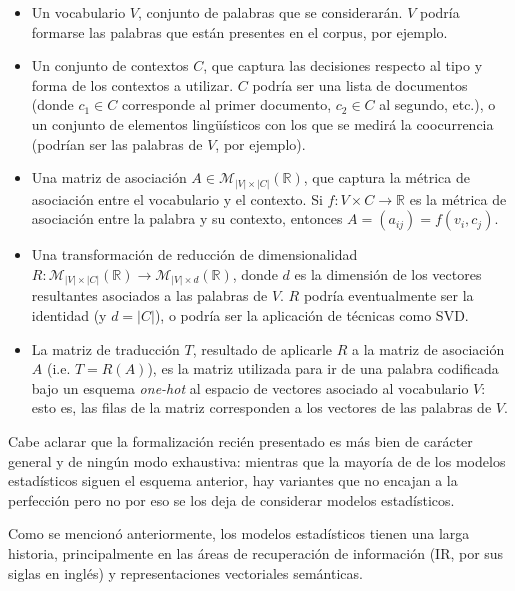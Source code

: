 \begin{itemize}

\item Un vocabulario $V$, conjunto de palabras que se considerarán. $V$ podría formarse las palabras
que están presentes en el corpus, por ejemplo.

\item Un conjunto de contextos $C$, que captura las decisiones respecto al tipo y forma de los
contextos a utilizar. $C$ podría ser una lista de documentos (donde $c_1 \in C$ corresponde al
primer documento, $c_2 \in C$ al segundo, etc.), o un conjunto de elementos lingüísticos con los que
se medirá la coocurrencia (podrían ser las palabras de $V$, por ejemplo).

\item Una matriz de asociación $A \in \mathcal{M}_{|V| \times |C|}(\mathbb{R})$, que captura la
métrica de asociación entre el vocabulario y el contexto. Si $f: V \times C \to \mathbb{R}$ es la
métrica de asociación entre la palabra y su contexto, entonces $A = (a_{ij}) = f(v_i, c_j)$.

\item Una transformación de reducción de dimensionalidad $R: \mathcal{M}_{|V| \times
|C|}(\mathbb{R}) \to \mathcal{M}_{|V| \times d}(\mathbb{R})$, donde $d$ es la dimensión de los
vectores resultantes asociados a las palabras de $V$. $R$ podría eventualmente ser la identidad (y
$d = |C|$), o podría ser la aplicación de técnicas como SVD\@.

\item La matriz de traducción $T$, resultado de aplicarle $R$ a la matriz de asociación $A$ (i.e. $T
= R(A)$), es la matriz utilizada para ir de una palabra codificada bajo un esquema \textit{one-hot}
al espacio de vectores asociado al vocabulario $V$: esto es, las filas de la matriz corresponden a
los vectores de las palabras de $V$.

\end{itemize}

Cabe aclarar que la formalización recién presentado es más bien de carácter general y de ningún modo
exhaustiva: mientras que la mayoría de de los modelos estadísticos siguen el esquema anterior, hay
variantes que no encajan a la perfección pero no por eso se los deja de considerar modelos
estadísticos.


Como se mencionó anteriormente, los modelos estadísticos tienen una larga historia, principalmente
en las áreas de recuperación de información (IR, por sus siglas en inglés) y representaciones
vectoriales semánticas.

